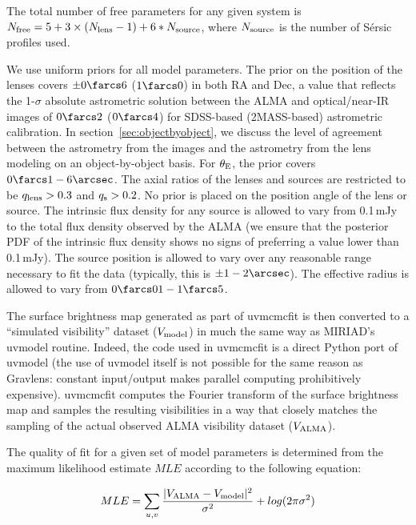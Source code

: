 \documentclass[iop]{emulateapj}
\begin{document}
The total number of free parameters for any given system is $N_{\rm free} = 5 +
3 \times (N_{\rm lens} - 1) + 6 * N_{\rm source}$, where $N_{\rm source}$ is
the number of S\'ersic profiles used.

We use uniform priors for all model parameters.  The prior on the position of
the lenses covers $\pm0\farcs6$ ($1\farcs0$) in both RA and Dec, a value that
reflects the 1-$\sigma$ absolute astrometric solution between the ALMA and
optical/near-IR images of $0\farcs2$ ($0\farcs4$) for SDSS-based (2MASS-based)
astrometric calibration.  In section~\ref{sec:objectbyobject}, we discuss the
level of agreement between the astrometry from the images and the astrometry
from the lens modeling on an object-by-object basis.  For $\theta_{\rm E}$, the
prior covers $0\farcs1 - 6\arcsec$.  The axial ratios of the lenses and sources
are restricted to be $q_{\rm lens} > 0.3$ and $q_{\rm s} > 0.2$. No prior is
placed on the position angle of the lens or source.  The intrinsic flux density
for any source is allowed to vary from 0.1$\,$mJy to the total flux density
observed by the ALMA (we ensure that the posterior PDF of the intrinsic flux
density shows no signs of preferring a value lower than 0.1$\,$mJy).  The source
position is allowed to vary over any reasonable range necessary to fit the data
(typically, this is $\pm 1-2\arcsec$).  The effective radius is allowed to vary
from $0\farcs01 - 1\farcs5$.

The surface brightness map generated as part of {\sc uvmcmcfit} is then
converted to a ``simulated visibility'' dataset ($V_{\rm model}$) in much the
same way as MIRIAD's {\sc uvmodel} routine.  Indeed, the code used in {\sc
uvmcmcfit} is a direct Python port of {\sc uvmodel} (the use of {\sc uvmodel}
itself is not possible for the same reason as {\sc Gravlens}: constant
input/output makes parallel computing prohibitively expensive).  {\sc
uvmcmcfit} computes the Fourier transform of the surface brightness map and
samples the resulting visibilities in a way that closely matches the sampling
of the actual observed ALMA visibility dataset ($V_{\rm ALMA}$).

The quality of fit for a given set of model parameters is determined from the
maximum likelihood estimate $MLE$ according to the following equation:

\begin{equation}
    MLE = \sum_{u, v} \frac{|V_{\rm ALMA} - V_{\rm
    model}|^2}{\sigma^2} + log(2 \pi \sigma^2) 
\end{equation}
\end{document}
